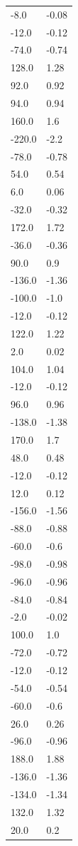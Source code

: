 \begin{longtable}{ll}
-8.0 & -0.08 \\
-12.0 & -0.12 \\
-74.0 & -0.74 \\
128.0 & 1.28 \\
92.0 & 0.92 \\
94.0 & 0.94 \\
160.0 & 1.6 \\
-220.0 & -2.2 \\
-78.0 & -0.78 \\
54.0 & 0.54 \\
6.0 & 0.06 \\
-32.0 & -0.32 \\
172.0 & 1.72 \\
-36.0 & -0.36 \\
90.0 & 0.9 \\
-136.0 & -1.36 \\
-100.0 & -1.0 \\
-12.0 & -0.12 \\
122.0 & 1.22 \\
2.0 & 0.02 \\
104.0 & 1.04 \\
-12.0 & -0.12 \\
96.0 & 0.96 \\
-138.0 & -1.38 \\
170.0 & 1.7 \\
48.0 & 0.48 \\
-12.0 & -0.12 \\
12.0 & 0.12 \\
-156.0 & -1.56 \\
-88.0 & -0.88 \\
-60.0 & -0.6 \\
-98.0 & -0.98 \\
-96.0 & -0.96 \\
-84.0 & -0.84 \\
-2.0 & -0.02 \\
100.0 & 1.0 \\
-72.0 & -0.72 \\
-12.0 & -0.12 \\
-54.0 & -0.54 \\
-60.0 & -0.6 \\
26.0 & 0.26 \\
-96.0 & -0.96 \\
188.0 & 1.88 \\
-136.0 & -1.36 \\
-134.0 & -1.34 \\
132.0 & 1.32 \\
20.0 & 0.2 \\

\end{longtable}
